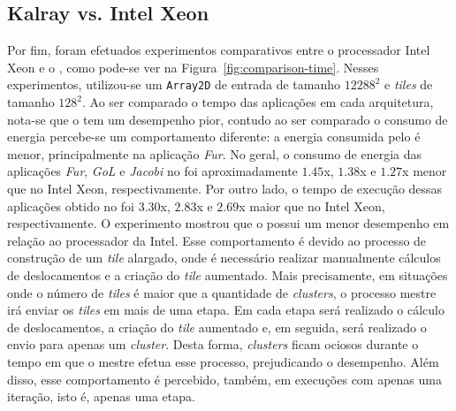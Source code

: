 \subsection{Kalray \mppa vs. Intel Xeon}


Por fim, foram efetuados experimentos comparativos entre o processador Intel
Xeon e o \mppa, como pode-se ver na Figura~\ref{fig:comparison-time}. Nesses
experimentos, utilizou-se um \texttt{Array2D} de entrada de tamanho $12288^2$ e
\textit{tiles} de tamanho $128^2$. Ao ser comparado o tempo das aplicações em
cada arquitetura, nota-se que o \mppa tem um desempenho pior, contudo ao ser
comparado o consumo de energia percebe-se um comportamento diferente: a energia
consumida pelo \mppa é menor, principalmente na aplicação \textit{Fur}. No
geral, o consumo de energia das aplicações \textit{Fur}, \textit{GoL} e
\textit{Jacobi} no \mppa foi aproximadamente $1.45$x, $1.38$x e $1.27$x menor
que no Intel Xeon, respectivamente. Por outro lado, o tempo de execução dessas
aplicações obtido no \mppa foi  $3.30$x, $2.83$x e $2.69$x maior que no Intel
Xeon, respectivamente. O experimento mostrou que o \mppa possui
um menor desempenho em relação ao processador da Intel. Esse comportamento é
devido ao processo de construção de um \textit{tile} alargado, onde é necessário
realizar manualmente cálculos de deslocamentos e a criação do \textit{tile}
aumentado. Mais precisamente, em situações onde o número
de \textit{tiles} é maior que a quantidade de \textit{clusters}, o processo
mestre irá enviar os \textit{tiles} em mais de uma etapa. Em cada etapa será
realizado o cálculo de deslocamentos, a criação do \textit{tile} aumentado e,
em seguida, será realizado o envio para apenas um \textit{cluster}. Desta forma,
\textit{clusters} ficam ociosos durante o tempo em que o mestre efetua
esse processo, prejudicando o desempenho. Além disso, esse comportamento é
percebido, também, em execuções com apenas uma iteração, isto é, apenas uma etapa.



